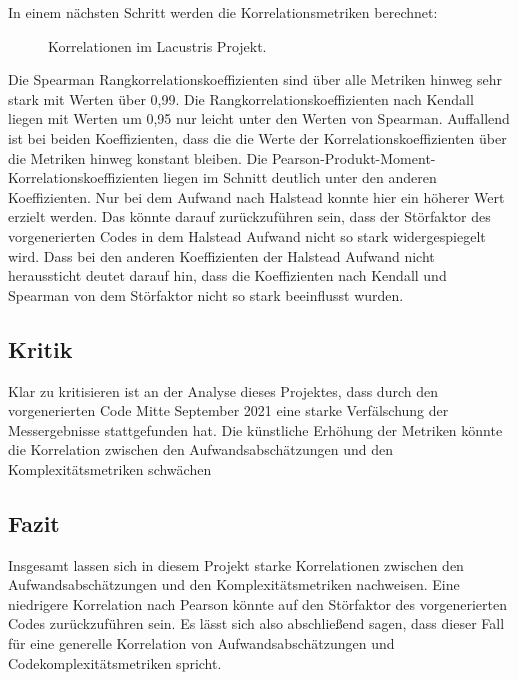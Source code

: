 In einem nächsten Schritt werden die Korrelationsmetriken berechnet:

\begin{figure}\label{lacustris-correlation-graph}
  \begin{center}
      
  \end{center}
  \caption{Korrelationen im Lacustris Projekt.}
\end{figure} 

Die Spearman Rangkorrelationskoeffizienten sind über alle Metriken
hinweg sehr stark mit Werten über 0,99. Die
Rangkorrelationskoeffizienten nach Kendall liegen mit Werten um 0,95 nur
leicht unter den Werten von Spearman. Auffallend ist bei beiden
Koeffizienten, dass die die Werte der Korrelationskoeffizienten über die
Metriken hinweg konstant bleiben. Die
Pearson-Produkt-Moment-Korrelationskoeffizienten liegen im Schnitt
deutlich unter den anderen Koeffizienten. Nur bei dem Aufwand nach
Halstead konnte hier ein höherer Wert erzielt werden. Das könnte darauf
zurückzuführen sein, dass der Störfaktor des vorgenerierten Codes in dem
Halstead Aufwand nicht so stark widergespiegelt wird. Dass bei den
anderen Koeffizienten der Halstead Aufwand nicht heraussticht deutet
darauf hin, dass die Koeffizienten nach Kendall und Spearman von dem
Störfaktor nicht so stark beeinflusst wurden.

\subsection{Kritik}\label{lm-kritik}

Klar zu kritisieren ist an der Analyse dieses Projektes, dass durch den
vorgenerierten Code Mitte September 2021 eine starke Verfälschung der
Messergebnisse stattgefunden hat. Die künstliche Erhöhung der Metriken
könnte die Korrelation zwischen den Aufwandsabschätzungen und den
Komplexitätsmetriken schwächen

\subsection{Fazit}\label{lm-fazit}

Insgesamt lassen sich in diesem Projekt starke Korrelationen zwischen
den Aufwandsabschätzungen und den Komplexitätsmetriken nachweisen. Eine
niedrigere Korrelation nach Pearson könnte auf den Störfaktor des
vorgenerierten Codes zurückzuführen sein. Es lässt sich also
abschlie\ss end sagen, dass dieser Fall für eine generelle Korrelation von
Aufwandsabschätzungen und Codekomplexitätsmetriken spricht.

